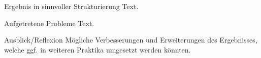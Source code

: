 \documentclass{beamer}
\begin{document}
\begin{frame}[fragile,t]{Ergebnis in sinnvoller Strukturierung}
Text.
\end{frame}

\begin{frame}[fragile,t]{Aufgetretene Probleme}
Text.
\end{frame}

\begin{frame}[fragile,t]{Ausblick/Reflexion}
Mögliche Verbesserungen und Erweiterungen des Ergebnisses, welche ggf. in weiteren Praktika umgesetzt werden könnten.
\end{frame}


\end{document}
